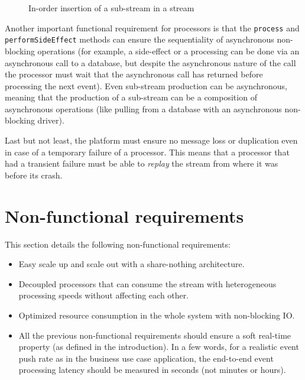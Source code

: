 \begin{figure}[H]
  \begin{center} 
    \caption{In-order insertion of a sub-stream in a stream}
    \label{fig:substream}
  \end{center}
\end{figure}

Another important functional requirement for processors is that the \verb|process| and \verb|performSideEffect| methods can ensure the
sequentiality of asynchronous non-blocking operations (for example, a side-effect or a processing can be done via an asynchronous call to a 
database, but despite the asynchronous nature of the call the processor must wait that the asynchronous call has returned
before processing the next event). Even sub-stream production can be asynchronous, meaning that the production of a sub-stream
can be a composition of asynchronous operations (like pulling from a database with an asynchronous non-blocking driver).

Last but not least, the platform must ensure no message loss or duplication even in case of a temporary failure of a processor. This means that a processor
that had a transient failure must be able to \textit{replay} the stream from where it was before its crash.

\section{Non-functional requirements}

This section details the following non-functional requirements:
\begin{itemize}
  \item Easy scale up and scale out with a share-nothing architecture.
  \item Decoupled processors that can consume the stream with heterogeneous processing speeds without affecting each other.
  \item Optimized resource consumption in the whole system with non-blocking IO.
  \item All the previous non-functional requirements should ensure a soft real-time property (as defined in the introduction). In a few words, for a realistic event push rate as in the business use case application, the end-to-end event processing latency should be measured in seconds (not minutes or hours).
\end{itemize}

